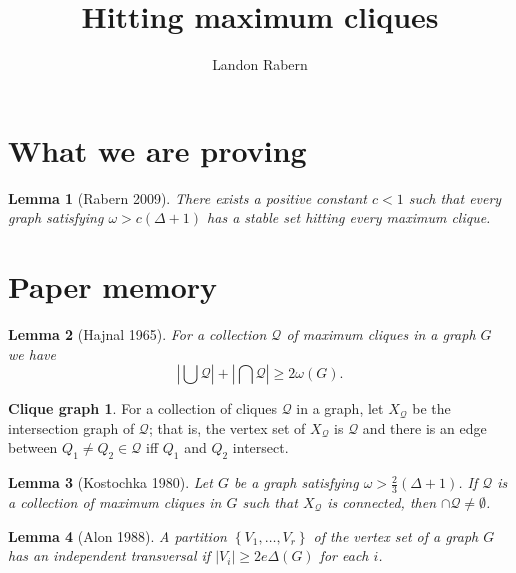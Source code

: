 \documentclass[12pt]{article}
\title{Hitting maximum cliques}
\author{Landon Rabern}
\theoremstyle{plain}
\newtheorem*{lem}{Lemma}
\theoremstyle{definition}
\newtheorem*{CliqueGraph}{Clique graph}
\theoremstyle{remark}
\newcommand{\fancy}[1]{\mathcal{#1}}
\newcommand{\set}[1]{\left\{ #1 \right\}}
\newcommand{\card}[1]{\left|#1\right|}
\begin{document}
\section*{What we are proving}
\begin{lem}[Rabern 2009]
There exists a positive constant $c < 1$ such that every graph satisfying $\omega > c(\Delta + 1)$ has a stable set hitting every maximum clique.
\end{lem}
\section*{Paper memory}
\begin{lem}[Hajnal 1965]
For a collection $\fancy{Q}$ of maximum cliques in a graph $G$ we have
\[\card{\bigcup \fancy{Q}} + \card{\bigcap \fancy{Q}} \geq 2\omega(G).\]
\end{lem}
\begin{CliqueGraph}
For a collection of cliques $\mathcal{Q}$ in a graph, let $X_{\mathcal{Q}}$ be the intersection graph of $\mathcal{Q}$; that is, the vertex set of $X_{\mathcal{Q}}$ is $\mathcal{Q}$ and there is an edge between $Q_1 \neq Q_2 \in \mathcal{Q}$ iff $Q_1$ and $Q_2$ intersect.
\end{CliqueGraph}
\begin{lem}[Kostochka 1980]
Let $G$ be a graph satisfying $\omega > \frac{2}{3}(\Delta + 1)$.   If $\mathcal{Q}$ is a collection of maximum cliques in $G$ such that $X_{\mathcal{Q}}$ is connected, then $\cap \mathcal{Q} \neq \emptyset$.
\end{lem}
\begin{lem}[Alon 1988]
A partition $\set{V_1, \ldots, V_r}$ of the vertex set of a graph $G$ has an independent transversal if $\card{V_i} \geq 2e\Delta(G)$ for each $i$.
\end{lem}

\nocite{haxell2001note}
\nocite{aharoni2007independent}
\nocite{KingAXiv}
\nocite{king2007upper}
\nocite{2009arXiv0907.3705R}
\nocite{alon1988linear}
\nocite{borodin1977upper}
\nocite{kostochkaRussian}
\nocite{hajnaltheorem}
\nocite{rabernhitting}

\tiny

\end{document}
